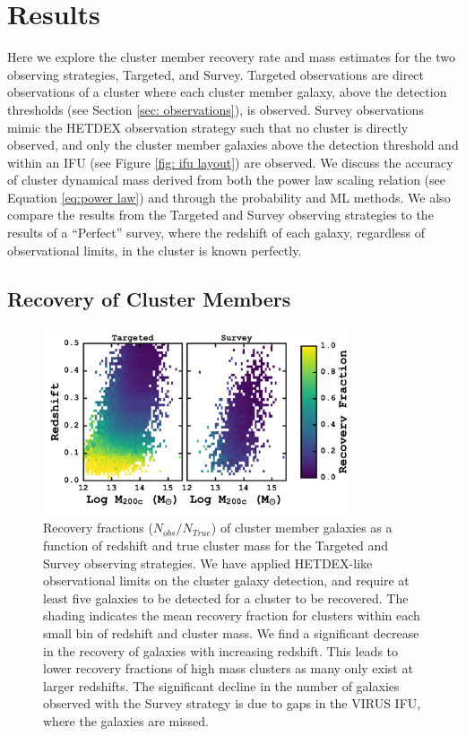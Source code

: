 \documentclass[fleqn,usenatbib]{mnras}
\begin{document}
\section{Results}\label{sec:results}
Here we explore the cluster member recovery rate and mass estimates for the two observing strategies, Targeted, and Survey. Targeted observations are direct observations of a cluster where each cluster member galaxy, above the detection thresholds (see Section \ref{sec: observations}), is observed. Survey observations mimic the HETDEX observation strategy such that no cluster is directly observed, and only the cluster member galaxies above the detection threshold and within an IFU (see Figure \ref{fig: ifu layout}) are observed.  We discuss the accuracy of cluster dynamical mass derived from both the power law scaling relation (see Equation \ref{eq:power law}) and through the probability and ML methods. We also compare the results from the Targeted and Survey observing strategies to the results of a ``Perfect'' survey, where the redshift of each galaxy, regardless of observational limits, in the cluster is known perfectly.

\subsection{Recovery of Cluster Members}
\begin{figure}
	\includegraphics[width=0.8\textwidth]{figures/recovery.pdf} 
	\caption[Recovery fractions for the Targeted and Survey observations.]{Recovery fractions ($N_{obs}/N_{True}$) of cluster member galaxies as a function of redshift and true cluster mass for the Targeted and Survey observing strategies. We have applied HETDEX-like observational limits on the cluster galaxy detection, and require at least five galaxies to be detected for a cluster to be recovered. The shading indicates the mean recovery fraction for clusters within each small bin of redshift and cluster mass. We find a significant decrease in the recovery of galaxies with increasing redshift. This leads to lower recovery fractions of high mass clusters as many only exist at larger redshifts. The significant decline in the number of galaxies observed with the Survey strategy is due to gaps in the VIRUS IFU, where the galaxies are missed.}
	\label{fig: recovery} 
\end{figure}
\end{document}
